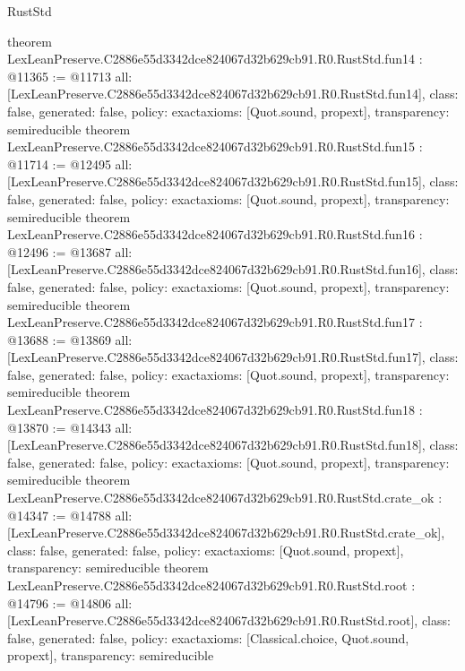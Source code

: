 \begin{lexlean}{RustStd}
\begin{coremodule}
{}
theorem LexLeanPreserve.C2886e55d3342dce824067d32b629cb91.R0.RustStd.fun14 : @11365 := @11713 {
  all: [LexLeanPreserve.C2886e55d3342dce824067d32b629cb91.R0.RustStd.fun14],
  class: false,
  generated: false,
  policy: exact{axioms: [Quot.sound, propext]},
  transparency: semireducible
}
theorem LexLeanPreserve.C2886e55d3342dce824067d32b629cb91.R0.RustStd.fun15 : @11714 := @12495 {
  all: [LexLeanPreserve.C2886e55d3342dce824067d32b629cb91.R0.RustStd.fun15],
  class: false,
  generated: false,
  policy: exact{axioms: [Quot.sound, propext]},
  transparency: semireducible
}
theorem LexLeanPreserve.C2886e55d3342dce824067d32b629cb91.R0.RustStd.fun16 : @12496 := @13687 {
  all: [LexLeanPreserve.C2886e55d3342dce824067d32b629cb91.R0.RustStd.fun16],
  class: false,
  generated: false,
  policy: exact{axioms: [Quot.sound, propext]},
  transparency: semireducible
}
theorem LexLeanPreserve.C2886e55d3342dce824067d32b629cb91.R0.RustStd.fun17 : @13688 := @13869 {
  all: [LexLeanPreserve.C2886e55d3342dce824067d32b629cb91.R0.RustStd.fun17],
  class: false,
  generated: false,
  policy: exact{axioms: [Quot.sound, propext]},
  transparency: semireducible
}
theorem LexLeanPreserve.C2886e55d3342dce824067d32b629cb91.R0.RustStd.fun18 : @13870 := @14343 {
  all: [LexLeanPreserve.C2886e55d3342dce824067d32b629cb91.R0.RustStd.fun18],
  class: false,
  generated: false,
  policy: exact{axioms: [Quot.sound, propext]},
  transparency: semireducible
}
theorem LexLeanPreserve.C2886e55d3342dce824067d32b629cb91.R0.RustStd.crate_ok : @14347 := @14788 {
  all: [LexLeanPreserve.C2886e55d3342dce824067d32b629cb91.R0.RustStd.crate_ok],
  class: false,
  generated: false,
  policy: exact{axioms: [Quot.sound, propext]},
  transparency: semireducible
}
theorem LexLeanPreserve.C2886e55d3342dce824067d32b629cb91.R0.RustStd.root : @14796 := @14806 {
  all: [LexLeanPreserve.C2886e55d3342dce824067d32b629cb91.R0.RustStd.root],
  class: false,
  generated: false,
  policy: exact{axioms: [Classical.choice, Quot.sound, propext]},
  transparency: semireducible
}


\end{coremodule}
\end{lexlean}
